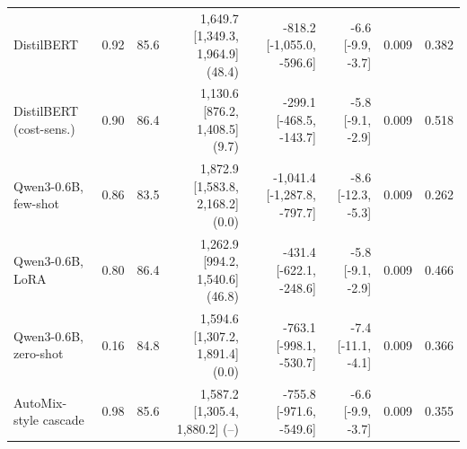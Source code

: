 \begin{tabular}{@{}lrrrrrrr@{}}
DistilBERT & 0.92 & 85.6 & 1{,}649.7 [1{,}349.3, 1{,}964.9] (48.4) & -818.2 [-1{,}055.0, -596.6] & -6.6 [-9.9, -3.7] & 0.009 & 0.382 \\
DistilBERT (cost-sens.) & 0.90 & 86.4 & 1{,}130.6 [876.2, 1{,}408.5] (9.7) & -299.1 [-468.5, -143.7] & -5.8 [-9.1, -2.9] & 0.009 & 0.518 \\
Qwen3-0.6B, few-shot & 0.86 & 83.5 & 1{,}872.9 [1{,}583.8, 2{,}168.2] (0.0) & -1{,}041.4 [-1{,}287.8, -797.7] & -8.6 [-12.3, -5.3] & 0.009 & 0.262 \\
Qwen3-0.6B, LoRA & 0.80 & 86.4 & 1{,}262.9 [994.2, 1{,}540.6] (46.8) & -431.4 [-622.1, -248.6] & -5.8 [-9.1, -2.9] & 0.009 & 0.466 \\
Qwen3-0.6B, zero-shot & 0.16 & 84.8 & 1{,}594.6 [1{,}307.2, 1{,}891.4] (0.0) & -763.1 [-998.1, -530.7] & -7.4 [-11.1, -4.1] & 0.009 & 0.366 \\
AutoMix-style cascade & 0.98 & 85.6 & 1{,}587.2 [1{,}305.4, 1{,}880.2] (--) & -755.8 [-971.6, -549.6] & -6.6 [-9.9, -3.7] & 0.009 & 0.355 \\
\bottomrule
\end{tabular}
